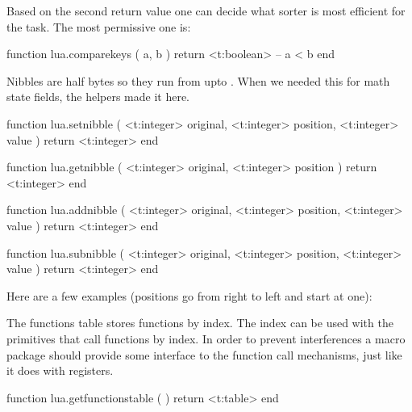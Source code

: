 Based on the second return value one can decide what sorter is most
efficient for the task. The most permissive one is:

\starttyping[option=LUA]
function lua.comparekeys ( a, b )
    return <t:boolean> -- a < b
end
\stoptyping

\stopsubsection

\startsubsection[title=Nibbles]

Nibbles are half bytes so they run from  upto . When we
needed this for math state fields, the helpers made it here.

\starttyping[option=LUA]
function lua.setnibble (
    <t:integer> original,
    <t:integer> position,
    <t:integer> value
)
    return <t:integer>
end
\stoptyping

\starttyping[option=LUA]
function lua.getnibble (
    <t:integer> original,
    <t:integer> position
)
    return <t:integer>
end
\stoptyping

\starttyping[option=LUA]
function lua.addnibble (
    <t:integer> original,
    <t:integer> position,
    <t:integer> value
)
    return <t:integer>
end
\stoptyping

\starttyping[option=LUA]
function lua.subnibble (
    <t:integer> original,
    <t:integer> position,
    <t:integer> value
)
    return <t:integer>
end
\stoptyping

Here are a few examples (positions go from right to left and start at one):

\protected{}

\starttabulate[|lT|r|]
\stoptabulate

\stopsubsection

\startsubsection[title=Functions]

The functions table stores functions by index. The index can be used with the
primitives that call functions by index. In order to prevent interferences a
macro package should provide some interface to the function call mechanisms, just
like it does with registers.

\starttyping[option=LUA]
function lua.getfunctionstable ( )
    return <t:table>
end
\stoptyping

